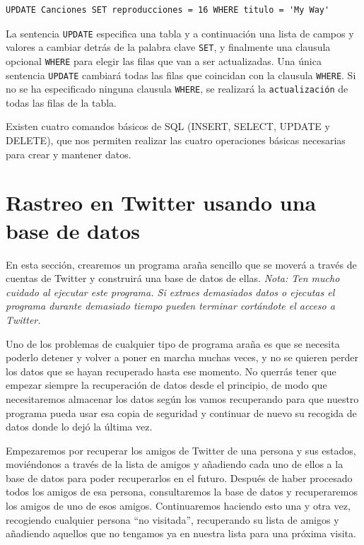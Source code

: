 \beforeverb
\begin{verbatim}
UPDATE Canciones SET reproducciones = 16 WHERE titulo = 'My Way'
\end{verbatim}
\afterverb
%
La sentencia {\tt UPDATE} especifica una tabla y a continuación
una lista de campos y valores a cambiar detrás de la palabra
clave {\tt SET}, y finalmente una clausula opcional {\tt WHERE} para elegir
las filas que van a ser actualizadas. Una única sentencia {\tt UPDATE}
cambiará todas las filas que coincidan con la clausula {\tt WHERE}.
Si no se ha especificado ninguna clausula {\tt WHERE}, se realizará la
{\tt actualización} de todas las filas de la tabla.

Existen cuatro comandos básicos de SQL (INSERT, SELECT, UPDATE y DELETE), que
nos permiten realizar las cuatro operaciones básicas necesarias para crear y mantener datos.

\section{Rastreo en Twitter usando una base de datos}

En esta sección, crearemos un programa araña sencillo que se moverá
a través de cuentas de Twitter y construirá una base de datos de ellas.
\emph{Nota: Ten mucho cuidado al ejecutar este programa. Si extraes
demasiados datos o ejecutas el programa durante demasiado tiempo
pueden terminar cortándote el acceso a Twitter.}

Uno de los problemas de cualquier tipo de programa araña es que se
necesita poderlo detener y volver a poner en marcha muchas veces, y
no se quieren perder los datos que se hayan recuperado hasta ese momento.
No querrás tener que empezar siempre la recuperación de datos desde
el principio, de modo que necesitaremos almacenar los datos según los vamos recuperando para
que nuestro programa pueda usar esa copia de seguridad y continuar de nuevo su recogida de datos
donde lo dejó la última vez.

Empezaremos por recuperar los amigos de Twitter de una persona y sus estados,
moviéndonos a través de la lista de amigos y añadiendo cada uno de ellos
a la base de datos para poder recuperarlos en el futuro. Después
de haber procesado todos los amigos de esa persona, consultaremos la base de datos
y recuperaremos los amigos de uno de esos amigos. Continuaremos haciendo esto una y otra vez,
recogiendo cualquier persona ``no visitada'', recuperando su lista de amigos
y añadiendo aquellos que no tengamos ya en nuestra lista para una próxima visita.

